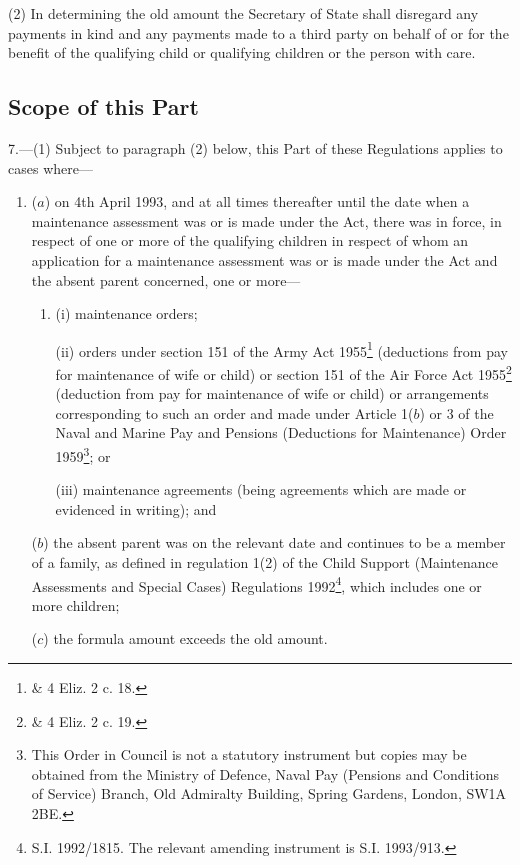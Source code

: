 \documentclass[12pt,a4paper]{article}
\begin{document}
(2) In determining the old amount the 
Secretary of State  %
shall disregard any payments in kind and any payments made to a third party on behalf of or for the benefit of the qualifying child or qualifying children or the person with care.


\subsection[7. Scope of this Part]{Scope of this Part}

7.—(1) Subject to paragraph (2) below, this Part of these Regulations applies to cases where—
\begin{enumerate}\item[]
($a$) on 4th April 1993, and at all times thereafter until the date when a maintenance assessment was or is made under the Act, there was in force, in respect of one or more of the qualifying children in respect of whom an application for a maintenance assessment was or is made under the Act and the absent parent concerned, one or more—
\begin{enumerate}\item[]
(i) maintenance orders;

(ii) orders under section 151 of the Army Act 1955\footnote{ \& 4 Eliz. 2 c. 18.} (deductions from pay for maintenance of wife or child) or section 151 of the Air Force Act 1955\footnote{ \& 4 Eliz. 2 c. 19.} (deduction from pay for maintenance of wife or child) or arrangements corresponding to such an order and made under Article 1($b$) or 3 of the Naval and Marine Pay and Pensions (Deductions for Maintenance) Order 1959\footnote{\frenchspacing This Order in Council is not a statutory instrument but copies may be obtained from the Ministry of Defence, Naval Pay (Pensions and Conditions of Service) Branch, Old Admiralty Building, Spring Gardens, London, SW1A 2BE.}; or

(iii) maintenance agreements (being agreements which are made or evidenced in writing); and
\end{enumerate}

($b$) the absent parent was on the relevant date and continues to be a member of a family, as defined in regulation 1(2) of the Child Support (Maintenance Assessments and Special Cases) Regulations 1992\footnote{\frenchspacing S.I. 1992/1815. The relevant amending instrument is S.I. 1993/913.}, which includes one or more children;

($c$) the formula amount exceeds the old amount.
\end{enumerate}
\end{document}
